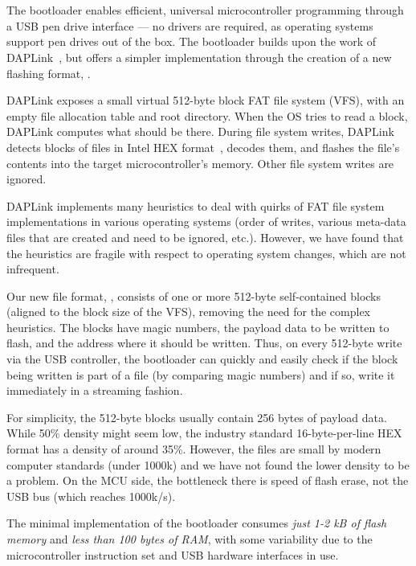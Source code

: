 \section{\UF}
\label{sec:uf2}

The \UF bootloader enables efficient, universal microcontroller programming through a USB pen drive interface --- no drivers are required, as operating systems support pen drives out of the box. The \UF bootloader builds upon the work of DAPLink~\cite{GitHubAR5:online}, but offers a simpler implementation through the creation of a new flashing format, \UFN.

DAPLink exposes a small virtual 512-byte block FAT file system (VFS), with an empty file allocation table and root directory. When the OS tries to read a block, DAPLink computes what should be there. During file system writes, DAP\-Link detects blocks of files in Intel HEX format~\cite{IntelHEX}, decodes them, and flashes the file's contents into the target microcontroller's memory. Other file system writes are ignored.

DAPLink implements many heuristics to deal with quirks of FAT file
system implementations in various operating systems (order of writes, various meta-data files that are created and need to be ignored, etc.).  However, we have found that the heuristics are fragile with respect to operating system changes, which are not infrequent.

Our new file format, \UFN, consists of one or more 512-byte self-contained blocks (aligned to the block size of the VFS), removing the need for the complex heuristics. The blocks have magic numbers, the payload data to be written to flash, and the address where it should be written. Thus, on every 512-byte write via the USB controller, the bootloader can quickly and easily check if the block being written is part of a \UF file (by comparing magic numbers) and if so, write it immediately in a streaming fashion.

For simplicity, the 512-byte \UF blocks usually contain 256 bytes of payload data. While 50\% density might seem low, the industry standard 16-byte-per-line HEX format has a density of around 35\%. However, the files are small by modern computer standards (under 1000k) and we have not found the lower density to be a problem. On the MCU side, the bottleneck there is speed of flash erase, not the USB bus (which reaches 1000k/s).

The minimal implementation of the \UF bootloader consumes \emph{just 1-2 kB of flash memory} and \emph{less than 100 bytes of RAM}, with some variability due to the microcontroller instruction set and USB hardware interfaces in use.

